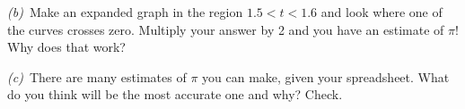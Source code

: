 \documentclass[12pt]{article}
\begin{document}
\textsl{(b)}~Make an expanded graph in the region $1.5<t<1.6$ and
look where one of the curves crosses zero.  Multiply your answer by 2 and you
have an estimate of $\pi$!  Why does that work?

\textsl{(c)}~There are many estimates of $\pi$ you can make, given
your spreadsheet. What do you think will be the most accurate one and
why? Check.
\end{document}

